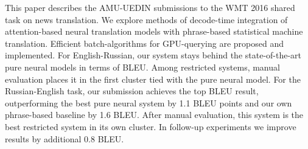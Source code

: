 This paper describes the AMU-UEDIN submissions to the WMT 2016 shared task on news translation. We explore methods of decode-time integration of attention-based neural translation models with phrase-based statistical machine translation. Efficient batch-algorithms for GPU-querying are proposed and implemented. For English-Russian, our system stays behind the state-of-the-art pure neural models in terms of BLEU. Among restricted systems, manual evaluation places it in the first cluster tied with the pure neural model. For the Russian-English task, our submission achieves the top BLEU result, outperforming the best pure neural system by 1.1 BLEU points and our own phrase-based baseline by 1.6 BLEU. After manual evaluation, this system is the best restricted system in its own cluster. In follow-up experiments we improve results by additional 0.8 BLEU.
